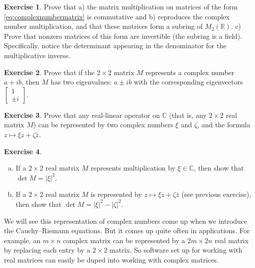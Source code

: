 \documentclass[12pt,openany]{book}
\newcommand{\sabs}[1]{\lvert {#1} \rvert}
\newcommand{\C}{{\mathbb{C}}}
\newcommand{\R}{{\mathbb{R}}}
\theoremstyle{plain}
\theoremstyle{remark}
\theoremstyle{definition}
\newenvironment{exbox}{%
    \def\FrameCommand{\vrule width 1pt \relax\hspace {10pt}}%
    \MakeFramed {\advance \hsize -\width \FrameRestore }%
}{%
    \endMakeFramed
}
\newenvironment{exparts}{%
    \leavevmode\begin{enumerate}[a),noitemsep,topsep=0pt,parsep=0pt,partopsep=0pt]
}{%
    \end{enumerate}
}
\theoremstyle{exercise}
\newtheorem{exercise}{Exercise}[section]
\theoremstyle{example}
\begin{document}
\begin{exbox}
\begin{exercise}
Prove that a) the matrix multiplication on matrices of the form
\eqref{eq:complexnumbermatrix}
is commutative and b) reproduces the complex
number multiplication, and that these matrices form a subring of $M_2(\R)$.
c) Prove that nonzero matrices of this form are
invertible (the subring is a field).  Specifically, notice the
determinant appearing in the denominator for the multiplicative inverse.
\end{exercise}

\begin{exercise}
Prove that if the $2 \times 2$ matrix $M$ represents a complex number
$a+ib$, then $M$ has two eigenvalues: $a \pm i b$ with the corresponding
eigenvectors $\left[ \begin{smallmatrix} 1 \\ \pm i \end{smallmatrix}
\right]$.
\end{exercise}

\begin{exercise} \label{exercise:reallinmap}
Prove that any real-linear operator on $\C$ (that is, any 
$2 \times 2$ real matrix $M$) can be represented 
by two complex numbers $\xi$ and $\zeta$, and the formula
$z \mapsto \xi z + \zeta \bar{z}$.
\end{exercise}

\begin{exercise}
\begin{exparts}
\item
If a $2 \times 2$ real matrix $M$ represents multiplication by $\xi \in \C$,
then show that $\det M = \sabs{\xi}^2$.
\item
If a $2 \times 2$ real matrix $M$ is represented by $z \mapsto \xi z + \zeta
\bar{z}$ (see previous exercise),
then show that $\det M = \sabs{\xi}^2 - \sabs{\zeta}^2$.
\end{exparts}
\end{exercise}
\end{exbox}

We will see this representation of complex numbers come up when we introduce the
Cauchy--Riemann equations.  But it comes up quite often in applications.
For example, 
an $m \times n$ complex matrix can be represented by a
$2m \times 2n$ real matrix by replacing each entry by a $2 \times 2$ matrix.
So software set up for working with real matrices can easily be duped into
working with complex matrices.
\end{document}
